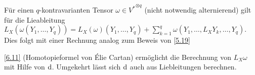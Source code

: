 
\begin{nt} \label{6.12}
    Für einen $q$-kontravarianten Tensor $\omega \in {V^*}^{\otimes q}$ (nicht notwendig alternierend) gilt für die Lieableitung
    \begin{math}
        L_X(\omega(Y_1, \dotsc, Y_q))
        = L_X(\omega)(Y_1, \dotsc, Y_q) + \sum_{k=1}^q \omega(Y_1, \dotsc, L_X Y_k, \dotsc, Y_q).
    \end{math}
    Dies folgt mit einer Rechnung analog zum Beweis von \ref{5.19}

    \ref{6.11} (Homotopieformel von Élie Cartan) ermöglicht die Berechnung von $L_X \omega$ mit Hilfe von $\mathrm{d}$.
    Umgekehrt lässt sich $\mathrm{d}$ auch aus Liebleitungen berechnen.
\end{nt}

